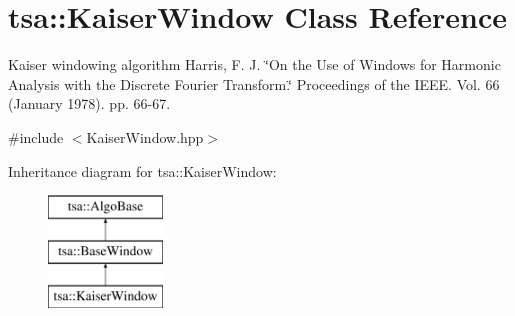 \hypertarget{classtsa_1_1_kaiser_window}{}\section{tsa\+:\+:Kaiser\+Window Class Reference}
\label{classtsa_1_1_kaiser_window}


Kaiser windowing algorithm Harris, F. J. \char`\"{}\+On the Use of Windows for Harmonic Analysis with the Discrete Fourier Transform.\char`\"{} Proceedings of the I\+E\+EE. Vol. 66 (January 1978). pp. 66-\/67.  




{\ttfamily \#include $<$Kaiser\+Window.\+hpp$>$}

Inheritance diagram for tsa\+:\+:Kaiser\+Window\+:\begin{figure}[H]
\begin{center}
\leavevmode
\includegraphics[height=3.000000cm]{classtsa_1_1_kaiser_window}
\end{center}
\end{figure}
